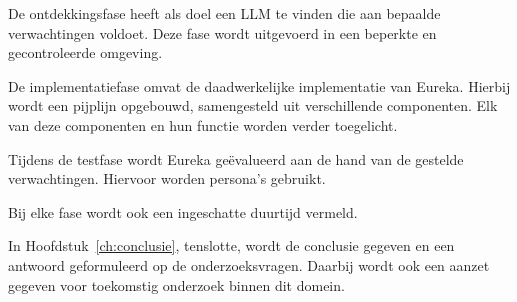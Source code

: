 De ontdekkingsfase heeft als doel een \acrshort{LLM} te vinden die aan bepaalde verwachtingen voldoet. Deze fase wordt uitgevoerd in een beperkte en gecontroleerde omgeving.

De implementatiefase omvat de daadwerkelijke implementatie van Eureka. Hierbij wordt een pijplijn opgebouwd, samengesteld uit verschillende componenten. Elk van deze componenten en hun functie worden verder toegelicht.

Tijdens de testfase wordt Eureka geëvalueerd aan de hand van de gestelde verwachtingen. Hiervoor worden persona's gebruikt.

Bij elke fase wordt ook een ingeschatte duurtijd vermeld.


In Hoofdstuk~\ref{ch:conclusie}, tenslotte, wordt de conclusie gegeven en een antwoord geformuleerd op de onderzoeksvragen. Daarbij wordt ook een aanzet gegeven voor toekomstig onderzoek binnen dit domein.